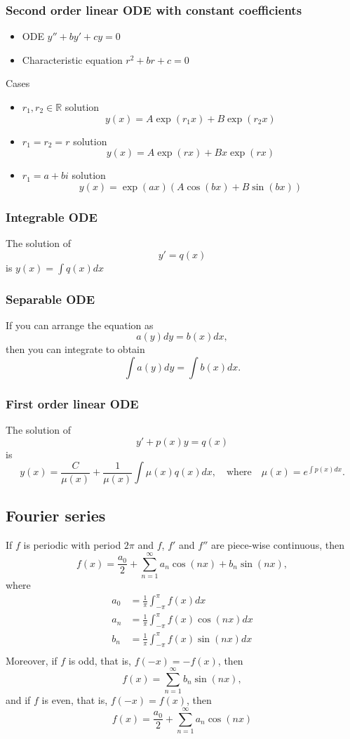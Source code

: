 \documentclass[12pt]{article}
\begin{document}
\subsubsection*{Second order linear ODE with constant coefficients}

\begin{itemize}
\item ODE $y''+by'+cy=0$
\item Characteristic equation $r^2+br+c=0$
\end{itemize}
Cases
\begin{itemize}
\item $r_1,r_2\in\mathbb{R}$ solution
$$
y(x)=A\exp(r_1x)+B\exp(r_2x)
$$
\item $r_1=r_2=r$ solution
$$
y(x)=A\exp(rx)+Bx\exp(rx)
$$
\item $r_1=a+bi$ solution
$$
y(x)=\exp(ax)(A\cos(bx)+B\sin(bx))
$$
\end{itemize}

\subsubsection*{Integrable ODE}
The solution of
$$
y'=q(x)
$$
is $y(x)=\int q(x)dx$

\subsubsection*{Separable ODE}
If you can arrange the equation as $$a(y)dy=b(x)dx,$$
then you can integrate to obtain $$\int a(y)dy=\int b(x)dx.$$

\subsubsection*{First order linear ODE}
The solution of
$$
y'+p(x)y=q(x)
$$
is
$$
y(x)=\frac{C}{\mu(x)}+\frac{1}{\mu(x)}\int \mu(x)q(x)dx,\quad\textrm{where}\quad
\mu(x)=e^{\int p(x)dx}.
$$

\newpage
\subsection*{Fourier series}

If $f$ is periodic with period $2\pi$ and $f$, $f'$ and $f''$ are piece-wise continuous, then
$$
f(x)
=\frac{a_0}{2}
+\sum_{n=1}^\infty a_n\cos(nx)+b_n\sin(nx),
$$
where
\begin{equation*}
\begin{split}
a_0&=\frac{1}{\pi}\int_{-\pi}^{\pi}
f(x)dx\\
a_n&=\frac{1}{\pi}\int_{-\pi}^{\pi}
f(x)\cos(nx)dx\\
b_n&=\frac{1}{\pi}\int_{-\pi}^{\pi}
f(x)\sin(nx)dx\\
\end{split}
\end{equation*}
Moreover, if $f$ is odd, that is, $f(-x)=-f(x)$,
then
$$
f(x)
=\sum_{n=1}^\infty b_n\sin(nx),
$$
and if $f$ is even, that is, $f(-x)=f(x)$, then
$$
f(x)
=\frac{a_0}{2}
+\sum_{n=1}^\infty a_n\cos(nx)
$$
\end{document}
